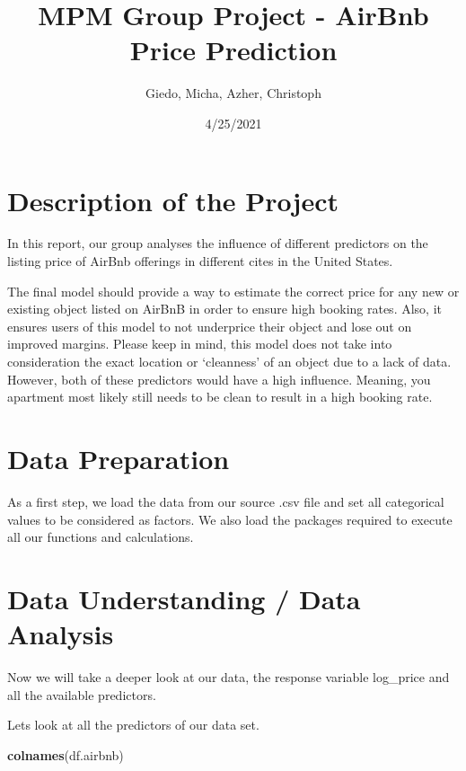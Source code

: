 \documentclass[
]{article}
\title{MPM Group Project - AirBnb Price Prediction}
\author{Giedo, Micha, Azher, Christoph}
\date{4/25/2021}
\newenvironment{Shaded}{\begin{snugshade}}{\end{snugshade}}
\newcommand{\KeywordTok}[1]{\textcolor[rgb]{0.13,0.29,0.53}{\textbf{#1}}}
\newcommand{\NormalTok}[1]{#1}
\begin{document}
\maketitle

\hypertarget{description-of-the-project}{%
\section{Description of the Project}\label{description-of-the-project}}

In this report, our group analyses the influence of different predictors
on the listing price of AirBnb offerings in different cites in the
United States.

The final model should provide a way to estimate the correct price for
any new or existing object listed on AirBnB in order to ensure high
booking rates. Also, it ensures users of this model to not underprice
their object and lose out on improved margins. Please keep in mind, this
model does not take into consideration the exact location or `cleanness'
of an object due to a lack of data. However, both of these predictors
would have a high influence. Meaning, you apartment most likely still
needs to be clean to result in a high booking rate.

\hypertarget{data-preparation}{%
\section{Data Preparation}\label{data-preparation}}

As a first step, we load the data from our source .csv file and set all
categorical values to be considered as factors. We also load the
packages required to execute all our functions and calculations.

\hypertarget{data-understanding-data-analysis}{%
\section{Data Understanding / Data
Analysis}\label{data-understanding-data-analysis}}

Now we will take a deeper look at our data, the response variable
log\_price and all the available predictors.

Lets look at all the predictors of our data set.

\begin{Shaded}
\begin{Highlighting}[]
\KeywordTok{colnames}\NormalTok{(df.airbnb)}
\end{Highlighting}
\end{Shaded}
\end{document}
